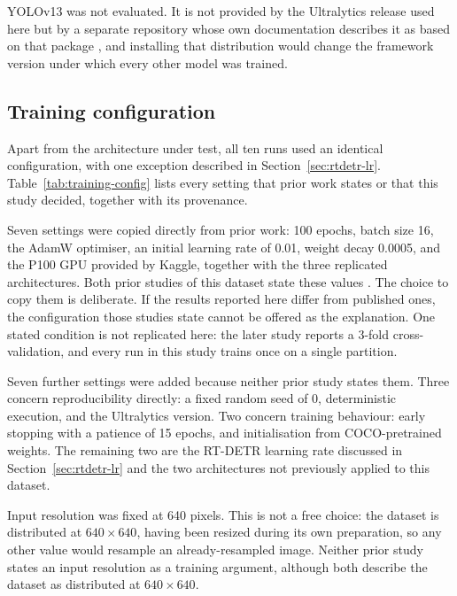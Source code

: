 YOLOv13 \citep{yolov13} was not evaluated. It is not provided by the Ultralytics
release used here but by a separate repository whose own documentation describes
it as based on that package \citep{yolov13repo}, and installing that
distribution would change the framework version under which every other model
was trained.

\subsection{Training configuration}
\label{sec:training-configuration}

Apart from the architecture under test, all ten runs used an identical
configuration, with one exception described in Section~\ref{sec:rtdetr-lr}.
Table~\ref{tab:training-config} lists every setting that prior work states or
that this study decided, together with its provenance.



Seven settings were copied directly from prior work: 100 epochs, batch size 16,
the AdamW optimiser, an initial learning rate of 0.01, weight decay 0.0005, and
the P100 GPU provided by Kaggle, together with the three replicated
architectures. Both prior studies of this dataset state these values
\citep{yolov12paper,yolov13paper}.
The choice to copy them is deliberate. If the results reported here differ from
published ones, the configuration those studies state cannot be offered as the
explanation.
One stated condition is not replicated here: the later study reports a 3-fold
cross-validation, and every run in this study trains once on a single partition.

Seven further settings were added because neither prior study states them.
Three concern reproducibility directly: a fixed random seed of 0, deterministic
execution, and the Ultralytics version. Two concern training behaviour: early
stopping with a patience of 15 epochs, and initialisation from COCO-pretrained
weights. The remaining two are the RT-DETR learning rate discussed in
Section~\ref{sec:rtdetr-lr} and the two architectures not previously applied to
this dataset.

Input resolution was fixed at 640 pixels. This is not a free choice: the dataset
is distributed at $640 \times 640$, having been resized during its own
preparation, so any other value would resample an already-resampled image.
Neither prior study states an input resolution as a training argument, although
both describe the dataset as distributed at $640 \times 640$.

